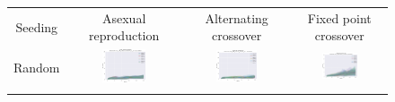 \documentclass{article}
\begin{document}
\begin{landscape}
\begin{figure}[t]
\begin{center}
\begin{tabular}{c c c c}
    Seeding & Asexual reproduction & Alternating crossover & Fixed point crossover \\
    Random & \includegraphics[align=c,width=0.42\textwidth]{rc/e3/1} & \includegraphics[align=c,width=0.42\textwidth]{rc/e3/2} & \includegraphics[align=c,width=0.42\textwidth]{rc/e3/3} \\
    & & & \\

\end{tabular}
\end{center}
\end{figure}
\end{landscape}
\end{document}
